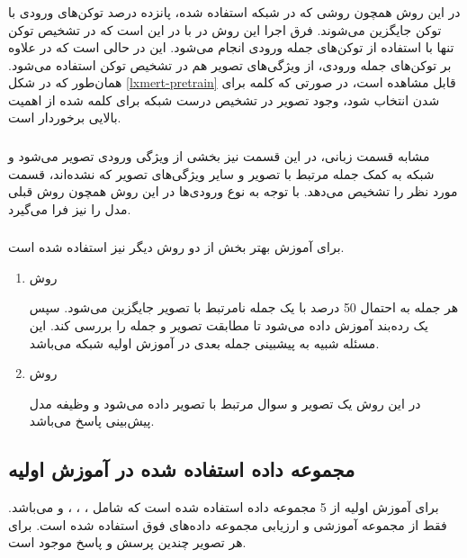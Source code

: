 \subsubsection{}
در این روش همچون روشی که در شبکه
استفاده شده، پانزده درصد توکن‌های ورودی با توکن
جایگزین می‌شوند. فرق اجرا این روش در 
با 
در این است که در 
تشخیص توکن
تنها با استفاده از توکن‌های جمله ورودی انجام می‌شود. این در حالی است که در 
علاوه بر توکن‌های جمله ورودی، از ویژگی‌های تصویر هم در تشخیص توکن
استفاده می‌شود. همان‌طور که در شکل 
\ref{lxmert-pretrain}
قابل مشاهده است، در صورتی که کلمه
برای 
شدن انتخاب شود،
وجود تصویر در تشخیص درست شبکه برای کلمه 
شده از اهمیت بالایی برخوردار است.
\subsubsection{}
مشابه قسمت زبانی، در این قسمت نیز بخشی از ویژگی ورودی تصویر
می‌شود و شبکه به کمک جمله مرتبط با تصویر و سایر ویژگی‌های تصویر که
نشده‌اند، قسمت مورد نظر را تشخیص می‌دهد. با توجه به نوع ورودی‌ها در این روش همچون روش قبلی مدل
را نیز فرا می‌گیرد. 

\subsubsection{}
برای آموزش بهتر بخش 
از دو روش دیگر نیز استفاده شده است.
\begin{enumerate}
	\item روش 
	
هر جمله به احتمال 50 درصد با یک جمله نامرتبط با تصویر جایگزین می‌شود. سپس یک رده‌بند
آموزش داده می‌شود تا مطابقت تصویر و جمله را بررسی کند. این مسئله شبیه به پیشبینی جمله بعدی 
در آموزش اولیه شبکه 
می‌باشد.

	\item روش 
	
در این روش یک تصویر و سوال مرتبط با تصویر داده می‌شود و وظیفه مدل پیش‌بینی پاسخ می‌باشد.
\end{enumerate}

\subsection{مجموعه داده استفاده شده در آموزش اولیه}
برای آموزش اولیه از 5 مجموعه داده استفاده شده است که شامل 
،
،
،
و
می‌باشد. فقط از مجموعه آموزشی
و ارزیابی
مجموعه داده‌های فوق استفاده شده است. برای هر تصویر چندین پرسش و پاسخ موجود است.

